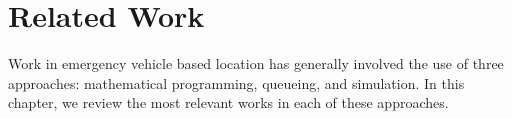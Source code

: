 \chapter{Related Work}
\label{ch:RelatedWork}
Work in emergency vehicle based location
has generally involved the use of three approaches:
mathematical programming,
queueing,
and simulation.
In this chapter,
we review
the most relevant works
in each of these approaches.




